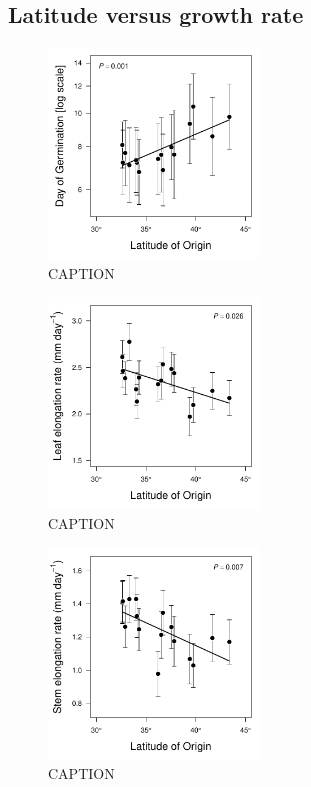 \documentclass[11pt, oneside]{article}
\begin{document}
\subsection*{Latitude versus growth rate}

\begin{figure}[h!]
	\centerline{\includegraphics[width=0.5\textwidth]{Figures/Figure_DoG_Lat.pdf}}
	\fontsize{10}{12}
	\selectfont
	\caption[Southern populations germinate sooner.]{CAPTION}
	\label{fig:Fig_DoG}
\end{figure}

\begin{figure}[h!]
	\centerline{\includegraphics[width=0.5\textwidth]{Figures/Figure_LLL_Lat.pdf}}
	\fontsize{10}{12}
	\selectfont
	\caption[Southern populations grow faster (leaf expansion rate).]{CAPTION}
	\label{fig:Fig_LLL}
\end{figure}

\begin{figure}
	\centerline{\includegraphics[width=0.5\textwidth]{Figures/Figure_Height_Lat.pdf}}
	\fontsize{10}{12}
	\selectfont
	\caption[Southern populations grow faster (stem elongation rate).]{CAPTION}
	\label{fig:Fig_height}
\end{figure}
\end{document}

